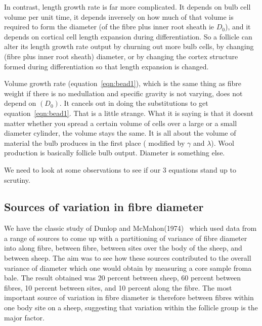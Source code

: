 \documentclass[titlepage]{article}  %
\begin{document}
In contrast, length growth rate is far more complicated. It depends on bulb cell volume per unit time, it depends inversely on how much of that volume is required to form the diameter (of the fibre plus inner root sheath ie $D_{0}$), and it depends on cortical cell length expansion during differentiation. So a follicle can alter its length growth rate output by churning out more bulb cells, by changing (fibre plus inner root sheath) diameter, or by changing the cortex structure formed during differentiation so that length expansion is changed.
 
Volume growth rate (equation~\ref{eqn:bead1}), which is the same thing as fibre weight if there is no medullation and specific gravity is not varying,  does not depend on $(D_{0})$. It cancels out in doing the substitutions to get equation~\ref{eqn:bead1}. That is a little strange. What it is saying is that it doesnt matter whether you spread a certain volume of cells over a large or a small diameter cylinder, the volume stays the same. It is all about the volume of material the bulb produces in the first place ( modified by $\gamma$ and $\lambda$). Wool production is basically follicle bulb output. Diameter is something else.

We need to look at some observations to see if our 3 equations stand up to scrutiny. 

\subsection{Sources of variation in fibre diameter}
We have the classic study of Dunlop and McMahon(1974)~\cite{dunl:74} which used data from a range of sources to come up with a partitioning of variance of fibre diameter into along fibre, between fibre, between sites over the body of the sheep, and between sheep. The aim was to see how these sources contributed to the overall variance of diameter which one would obtain by measuring a core sample froma bale. The result obtained was  20 percent between sheep,  60 percent between fibres, 10 percent between sites, and 10 percent along the fibre. The most important source of variation in fibre diameter is therefore between fibres within one body site on a sheep, suggesting that variation within the follicle group is the major factor. 
\end{document}
